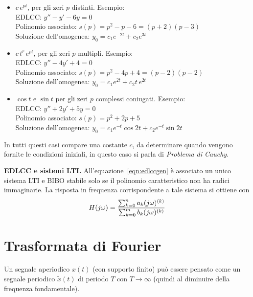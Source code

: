 \documentclass[a4paper,portrait,12pt]{article}
\theoremstyle{definition}
\begin{document}
\begin{itemize}
\item $c\,e^{pt}$, per gli zeri $p$ distinti. Esempio:\\
	EDLCC: $y'' - y' -6y = 0$\\
	Polinomio associato: $s(p) = p^2 - p - 6 = (p + 2)(p - 3)$\\
	Soluzione dell'omogenea: $y_0 = c_1e^{-2t} + c_2e^{3t}$
\item $c\,t^r\,e^{pt}$, per gli zeri $p$ multipli. Esempio:\\
	EDLCC: $y'' - 4y' +4 = 0$\\
	Polinomio associato: $s(p) = p^2 - 4p + 4 = (p -2) (p-2)$\\
	Soluzione dell'omogenea: $y_0 = c_1e^{2t} + c_2t\,e^{2t}$
\item $\cos t$ e $\sin t$ per gli zeri $p$ complessi coniugati. Esempio:\\
	EDLCC: $y'' + 2y' + 5 y=0$\\
	Polinomio associato: $s(p) = p^2 + 2p + 5$\\
	Soluzione dell'omogenea: $y_0 = c_1 e^{-t} \cos 2t + c_2 e^{-t} \sin 2t$
\end{itemize}
In tutti questi casi compare una costante $c$, da determinare quando vengono fornite le condizioni iniziali,
in questo caso si parla di \textit{Problema di Cauchy}.
\bigskip

\textbf{EDLCC e sistemi LTI.} All'equazione~\eqref{eqn:edlccgen} è associato un unico sistema LTI e BIBO 
stabile solo se il polinomio caratteristico non ha radici immaginarie. La risposta in frequenza 
corrispondente a tale sistema si ottiene con
\begin{equation}
H(j\omega) = {\sum_{k=0}^n a_k (j\omega)^{(k)} \over \sum_{k=0}^m b_k (j\omega)^{(k)}}
\end{equation}
\bigskip

\section{Trasformata di Fourier}
Un segnale aperiodico $x(t)$ (con supporto finito) può essere pensato come un segnale periodico 
$\tilde{x}(t)$ di periodo $T$ con $T \to \infty$ (quindi al diminuire della frequenza fondamentale).
\bigskip 
\end{document}
